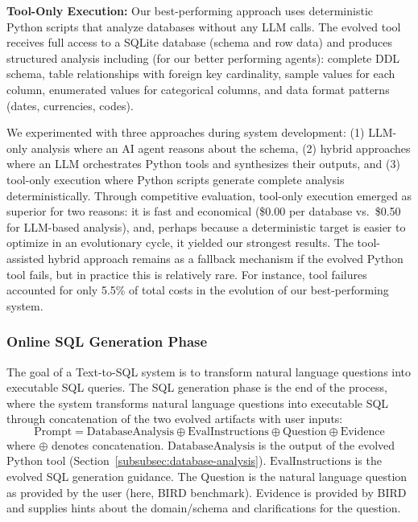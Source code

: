 \documentclass{article}
\begin{document}
\textbf{Tool-Only Execution:} Our best-performing approach uses deterministic Python scripts that analyze databases without any LLM calls. The evolved tool receives full access to a SQLite database (schema and row data) and produces structured analysis including (for our better performing agents): complete DDL schema, table relationships with foreign key cardinality, sample values for each column, enumerated values for categorical columns, and data format patterns (dates, currencies, codes).

We experimented with three approaches during system development: (1) LLM-only analysis where an AI agent reasons about the schema, (2) hybrid approaches where an LLM orchestrates Python tools and synthesizes their outputs, and (3) tool-only execution where Python scripts generate complete analysis deterministically. Through competitive evaluation, tool-only execution emerged as superior for two reasons: it is fast and economical (\$0.00 per database vs.\ \$0.50 for LLM-based analysis), and, perhaps because a deterministic target is easier to optimize in an evolutionary cycle, it yielded our strongest results. 
The tool-assisted hybrid approach remains as a fallback mechanism if the evolved Python tool fails, but in practice this is relatively rare. For instance, tool failures accounted for only 5.5\% of total costs in the evolution of our best-performing system.

\subsubsection{Online SQL Generation Phase}
\label{subsubsec:sql-gen}

The goal of a Text-to-SQL system is to transform natural language questions into executable SQL queries. The SQL generation phase is the end of the process, where the system transforms natural language questions into executable SQL through concatenation of the two evolved artifacts with user inputs:
$$\text{Prompt} = \text{DatabaseAnalysis} \oplus \text{EvalInstructions} \oplus \text{Question} \oplus \text{Evidence}$$
where $\oplus$ denotes concatenation. $\text{DatabaseAnalysis}$ is the output of the evolved Python tool (Section~\ref{subsubsec:database-analysis}). $\text{EvalInstructions}$ is the evolved SQL generation guidance. The Question is the natural language question as provided by the user (here, BIRD benchmark). Evidence is provided by BIRD and supplies hints about the domain/schema and clarifications for the question.
\end{document}

